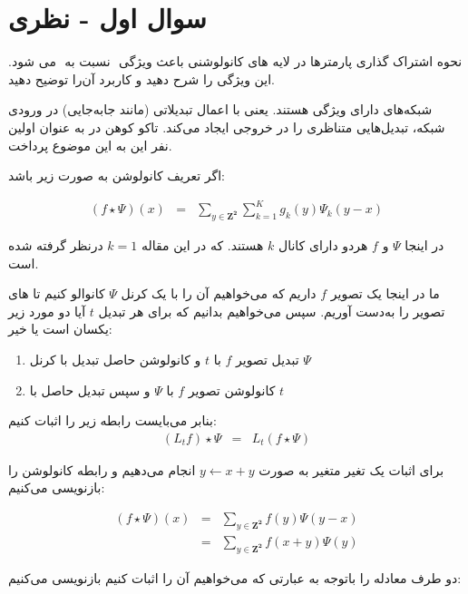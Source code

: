 \section{سوال اول - نظری}

نحوه اشتراک گذاری پارمتر‌ها  در لایه های کانولوشنی باعث ویژگی ‫‪‬‬ نسبت به ‫‪‬‬ می شود. این ویژگی را شرح دهید و کاربرد آن‌را توضیح دهید.



\begin{qsolve}
شبکه‌های  دارای ویژگی  هستند. یعنی با اعمال تبدیلاتی (مانند جابه‌جایی) در ورودی شبکه، تبدیل‌هایی متناظری را در خروجی ایجاد می‌کند. تاکو کوهن در \cite{ref1} به عنوان‌ اولین نفر این به این موضوع پرداخت.

اگر تعریف کانولوشن به صورت زیر باشد:

	\begin{eqnarray*}
		(f \star \Psi)(x)&=&\sum_{y\in \mathbf{Z^2}}\sum_{k=1}^{K}g_k(y)\Psi_k(y-x)
	\end{eqnarray*}
	
	در اینجا $\Psi$ و $f$ هردو دارای کانال $k$ هستند. که در این مقاله $k=1$ درنظر گرفته شده است.
	
ما در اینجا یک تصویر $f$ داریم که می‌خواهیم آن را با یک کرنل $\Psi$ کانوالو کنیم تا  های تصویر را به‌دست آوریم. سپس می‌خواهیم بدانیم که برای هر تبدیل  $t$ آیا دو مورد زیر یکسان است یا خیر:

\begin{enumerate}
	\item تبدیل تصویر $f$ با $t$ و کانولوشن حاصل تبدیل با کرنل $\Psi$ 
	
	\item کانولوشن تصویر $f$ با $\Psi$ و سپس تبدیل حاصل با $t$
\end{enumerate}

بنابر می‌بایست رابطه زیر را اثبات کنیم:
\begin{eqnarray*}
	(L_tf)\star \Psi&=&L_t(f\star \Psi)
\end{eqnarray*}

برای اثبات یک تغیر متغیر به صورت $y\leftarrow x+y$ انجام می‌دهیم و رابطه کانولوشن را بازنویسی می‌کنیم:

\begin{eqnarray*}
	(f \star \Psi)(x)&=&\sum_{y\in \mathbf{Z^2}} f(y)\Psi(y-x)\\
	&=&\sum_{y\in \mathbf{Z^2}} f(x+y)\Psi(y)
\end{eqnarray*}

دو طرف معادله را باتوجه به عبارتی که می‌خواهیم آن را اثبات کنیم بازنویسی می‌کنیم:
\end{qsolve}


